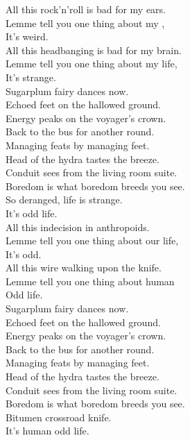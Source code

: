 
All this rock'n'roll is bad for my ears. \\
Lemme tell you one thing about my , \\
It's weird. \\
All this headbanging is bad for my brain. \\
Lemme tell you one thing about my life, \\
It's strange. \\

Sugarplum fairy dances now. \\
Echoed feet on the hallowed ground. \\
Energy peaks on the voyager's crown. \\
Back to the bus for another round. \\
Managing feats by managing feet. \\
Head of the hydra tastes the breeze. \\
Conduit sees from the living room suite. \\
Boredom is what boredom breeds you see. \\

So deranged, life is strange. \\
It's  odd life. \\

All this indecision in anthropoids. \\
Lemme tell you one thing about our life, \\
It's odd. \\
All this wire walking upon the knife. \\
Lemme tell you one thing about human \\
Odd life. \\

Sugarplum fairy dances now. \\
Echoed feet on the hallowed ground. \\
Energy peaks on the voyager's crown. \\
Back to the bus for another round. \\
Managing feats by managing feet. \\
Head of the hydra tastes the breeze. \\
Conduit sees from the living room suite. \\
Boredom is what boredom breeds you see. \\

Bitumen crossroad knife. \\
It's human odd life. \\

